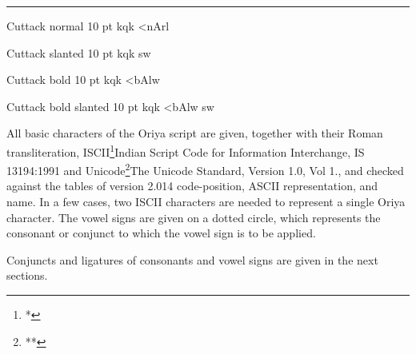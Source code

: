 \vskip3mm
\hrule
\vskip3mm

\begindoublecolumns

Cuttack normal 10 pt
{\orss kqk <nAr\orsecma l \orsample}

\medskip Cuttack slanted 10 pt
{\orsssl kqk s\orsecla\ornta w \orsample}

\medskip Cuttack bold 10 pt
{\orssbf kqk <bAl\orhalant w \orsample}

\medskip Cuttack bold slanted 10 pt
{\orssbs kqk <bAl\orhalant w s\orsecla\ornta w \orsample}

\enddoublecolumns

\vfill\eject

\bigskip

All basic characters of the Oriya script are given, together with their Roman
transliteration, ISCII\footnote{*}{Indian Script Code for Information Interchange, 
IS 13194:1991} and Unicode\footnote{**}{The Unicode Standard, Version 1.0, Vol 1., 
and checked against the tables of version 2.014} code-position, ASCII representation, 
and name. In a few cases, two ISCII characters are needed to represent a single 
Oriya character. The vowel signs are given on a dotted circle, which represents 
the consonant or conjunct to which the vowel sign is to be applied.

Conjuncts and ligatures of consonants and vowel signs are given in the
next sections.

\medskip

